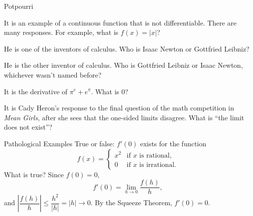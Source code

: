 \documentclass{article}
\begin{document}
\begin{category}{Potpourri}

  \begin{clue}[say]
    It is an example of a continuous function that is not differentiable.
  \response
    There are many responses. For example, what is $f(x) = |x|$?
  \end{clue}

  \begin{clue}[say]
    He is one of the inventors of calculus.
  \response
    Who is Isaac Newton or Gottfried Leibniz?
  \end{clue}

  \begin{clue}[say]
    He is the other inventor of calculus.
  \response
    Who is Gottfried Leibniz or Isaac Newton, whichever wasn't named
    before?
  \end{clue}

  \begin{clue}[say]
    It is the derivative of $\pi^e + e^\pi.$
  \response
    What is $0$?
  \end{clue}

  \begin{clue}[say]
    It is Cady Heron's response to the final question of the math
    competition in \emph{Mean Girls}, after she sees that the one-sided
    limits disagree.
  \response
    What is ``the limit does not exist''?
  \end{clue}

\end{category}

\begin{final}{Pathological Examples}
  True or false: $f'(0)$ exists for the function
  \[
  f(x) =
  \begin{cases}
    x^2 & \text{if } x \text{ is rational,} \\
    0 & \text{if } x \text{ is irrational.}
  \end{cases}
  \]
\response
  What is true?
\solution
  Since $f(0) = 0,$
  \[ f'(0) = \lim_{h\to 0} \frac{f(h)}{h}, \]
  and $\left|\dfrac{f(h)}{h}\right| \le \dfrac{h^2}{|h|} = |h| \to 0.$ By the
  Squeeze Theorem, $f'(0) = 0.$
\end{final}
\end{document}
